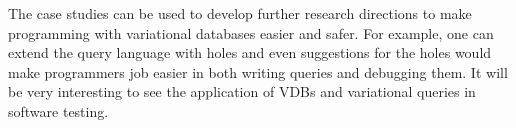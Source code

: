 The case studies can be used to develop further research directions
to make programming with variational databases easier and safer.
%
%
For example, one can extend the query language with holes and even suggestions for 
the holes would make programmers job easier in both writing queries
and debugging them.
%
It will be very interesting to see the application of VDBs and 
variational queries in software testing.

